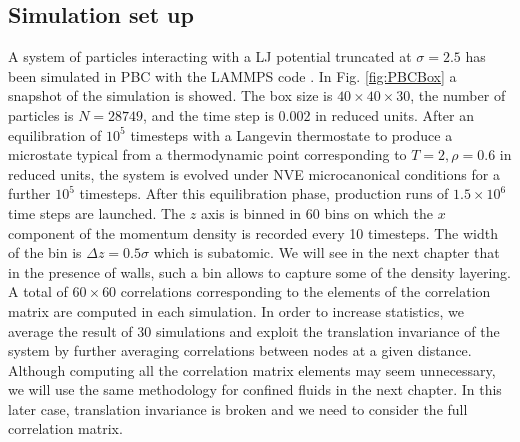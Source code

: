 \documentclass[b5paper,openright,10pt]{book}
\begin{document}
\subsection{Simulation set up}
\label{Sec:SimSetUpPBC}
A  system  of particles  interacting  with  a LJ  potential
truncated at  $\sigma=2.5$ has been  simulated in PBC with  the LAMMPS code \cite{Plimpton1995}.
In Fig. \ref{fig:PBCBox} a snapshot of the simulation is showed.
The box  size is $40\times40\times30$, the  number of particles
is $N=28749$, and the time step is $0.002$ in reduced units.  After an
equilibration  of  $10^5$ timesteps  with  a  Langevin thermostate  to
produce a microstate typical  from a thermodynamic point corresponding
to $T=2,\rho=0.6$  in reduced units,  the system is evolved  under NVE
microcanonical conditions for a  further $10^5$ timesteps.  After this
equilibration phase,  production runs  of $1.5\times 10^6$  time steps
are launched.  The  $z$ axis is binned  in $60$ bins on  which the $x$
component of the momentum density is recorded every 10 timesteps.  The
width of the  bin is $\Delta z=0.5\sigma$ which is  subatomic.  We will see in the next chapter that in the
presence of walls,  such a bin allows to capture some of the density layering.  A total of $60\times  60$ correlations corresponding to the
elements of  the correlation matrix  are computed in  each simulation.
In  order  to increase  statistics,  we  average  the result  of  $30$
simulations and  exploit the  translation invariance  of the  system by
further  averaging correlations  between  nodes at  a given  distance.
Although  computing  all  the  correlation matrix  elements  may  seem
unnecessary, we will  use the same methodology for  confined fluids in
the next chapter. In this later case, translation invariance is
broken and we need to consider the full correlation matrix.
\end{document}
